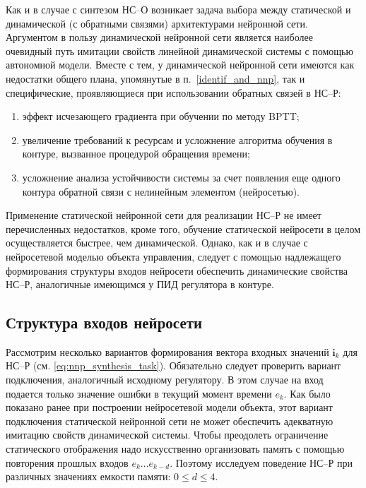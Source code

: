 Как и в случае с синтезом НС--О возникает задача выбора между
статической и динамической (с обратными связями) архитектурами
нейронной сети.  Аргументом в пользу динамической нейронной сети
является наиболее очевидный путь имитации свойств линейной
динамической системы с помощью автономной модели.  Вместе с тем, у
динамической нейронной сети имеются как недостатки общего плана,
упомянутые в п.~\ref{identif_and_nnp}, так и специфические,
проявляющиеся при использовании обратных связей в НС--Р:

\begin{enumerate}
\item эффект исчезающего градиента при обучении по методу BPTT;
\item увеличение требований к ресурсам и усложнение алгоритма обучения
      в контуре, вызванное процедурой обращения времени;
\item усложнение анализа устойчивости системы за счет появления еще
      одного контура обратной связи с нелинейным элементом (нейросетью).
\end{enumerate}

Применение статической нейронной сети для реализации НС--Р не имеет
перечисленных недостатков, кроме того, обучение статической нейросети
в целом осуществляется быстрее, чем динамической.  Однако, как и в
случае с нейросетевой моделью объекта управления, следует с помощью
надлежащего формирования структуры входов нейросети обеспечить
динамические свойства НС--Р, аналогичные имеющимся у ПИД регулятора в
контуре.

\subsection{Структура входов нейросети}

Рассмотрим несколько вариантов формирования вектора входных значений
$\mathbf{i}_k$ для НС--Р (см. \eqref{eq:nnp_synthesis_task}).
Обязательно следует проверить вариант подключения, аналогичный
исходному регулятору.  В этом случае на вход подается только значение
ошибки в текущий момент времени $e_k$.  Как было показано ранее при
построении нейросетевой модели объекта, этот вариант подключения
статической нейронной сети не может обеспечить адекватную имитацию
свойств динамической системы.  Чтобы преодолеть ограничение
статического отображения надо искусственно организовать память с
помощью повторения прошлых входов $e_k\ldots e_{k-d}$.  Поэтому
исследуем поведение НС--Р при различных значениях емкости памяти:
$0\le d\le 4$.

